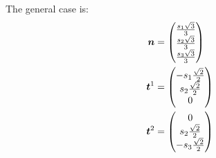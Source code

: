 The general case is:
\begin{align}
	{\boldsymbol {n}}&=\begin{pmatrix}
		\frac{s_1\sqrt{3}}{3}\\
		\frac{s_2\sqrt{3}}{3}\\
		\frac{s_3\sqrt{3}}{3}
	\end{pmatrix}\\
	{\boldsymbol {t}}^1&=\begin{pmatrix}
			-s_1\frac{\sqrt{2}}{2}\\
			s_2\frac{\sqrt{2}}{2}\\
			0
		\end{pmatrix}\\
		{\boldsymbol {t}}^2&=\begin{pmatrix}
			0\\
			s_2\frac{\sqrt{2}}{2}\\
			-s_3\frac{\sqrt{2}}{2}
		\end{pmatrix}
\end{align}

